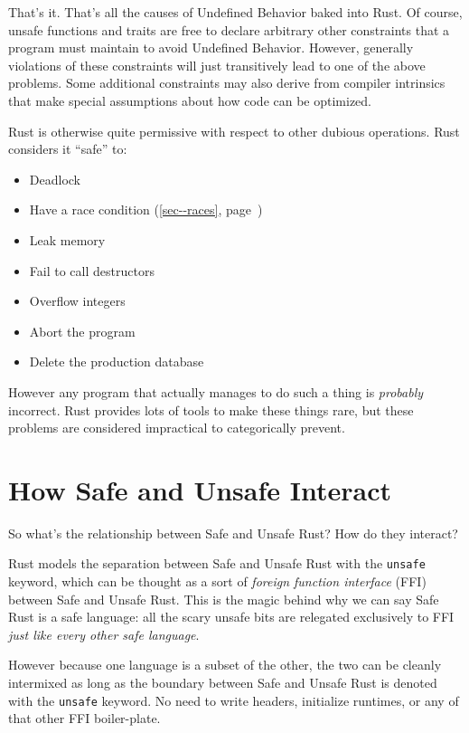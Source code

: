 \documentclass[a4paper,]{book}
\renewcommand*{\hyperlink}[2]{%
 #2 (\autoref{#1}, page~\pageref{#1})}
\providecommand{\tightlist}{%
  \setlength{\itemsep}{0pt}\setlength{\parskip}{0pt}}
\begin{document}
That's it. That's all the causes of Undefined Behavior baked into Rust.
Of course, unsafe functions and traits are free to declare arbitrary
other constraints that a program must maintain to avoid Undefined
Behavior. However, generally violations of these constraints will just
transitively lead to one of the above problems. Some additional
constraints may also derive from compiler intrinsics that make special
assumptions about how code can be optimized.

Rust is otherwise quite permissive with respect to other dubious
operations. Rust considers it ``safe'' to:

\begin{itemize}
\tightlist
\item
  Deadlock
\item
  Have a \protect\hyperlink{sec--races}{race condition}
\item
  Leak memory
\item
  Fail to call destructors
\item
  Overflow integers
\item
  Abort the program
\item
  Delete the production database
\end{itemize}

However any program that actually manages to do such a thing is
\emph{probably} incorrect. Rust provides lots of tools to make these
things rare, but these problems are considered impractical to
categorically prevent.

\section{How Safe and Unsafe Interact}\label{sec--safe-unsafe-meaning}

So what's the relationship between Safe and Unsafe Rust? How do they
interact?

Rust models the separation between Safe and Unsafe Rust with the
\texttt{unsafe} keyword, which can be thought as a sort of \emph{foreign
function interface} (FFI) between Safe and Unsafe Rust. This is the
magic behind why we can say Safe Rust is a safe language: all the scary
unsafe bits are relegated exclusively to FFI \emph{just like every other
safe language}.

However because one language is a subset of the other, the two can be
cleanly intermixed as long as the boundary between Safe and Unsafe Rust
is denoted with the \texttt{unsafe} keyword. No need to write headers,
initialize runtimes, or any of that other FFI boiler-plate.
\end{document}
